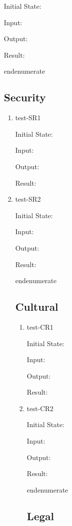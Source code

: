 \documentclass[12pt, titlepage]{article}
\begin{document}
\begin{enumerate}
\begin{enumerate}
\begin{enumerate}
\begin{enumerate}
\begin{enumerate}
  Initial State:

  Input:

  Output:

  Result:

end{enumerate}

\subsection{Security} \label{section:4.6}

\begin{enumerate}

  \item{test-SR1} \label{test-SR1}

  Initial State:

  Input:

  Output:

  Result:

  \item{test-SR2} \label{test-SR2}

  Initial State:

  Input:

  Output:

  Result:

end{enumerate}

\subsection{Cultural} \label{section:4.7}

\begin{enumerate}

  \item{test-CR1} \label{test-CR1}

  Initial State:

  Input:

  Output:

  Result:

  \item{test-CR2} \label{test-CR2}

  Initial State:

  Input:

  Output:

  Result:

end{enumerate}

\subsection{Legal} \label{section:4.8}


\end{enumerate}
\end{enumerate}
\end{enumerate}
\end{enumerate}
\end{enumerate}
\end{enumerate}
\end{enumerate}
\end{document}
